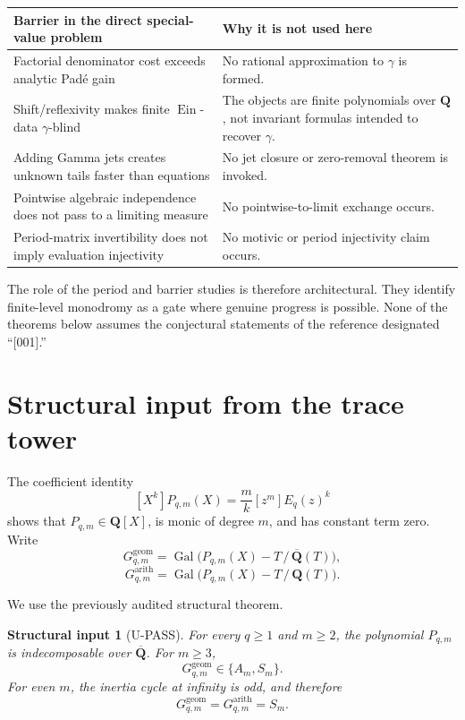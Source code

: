\documentclass[11pt]{article}
\theoremstyle{keio}
\theoremstyle{keioinput}
\newtheorem*{structural}{Structural input}
\newcommand{\UPASS}{\textcolor{passgreen}{\textsf{U-PASS}}}
\newcommand{\Q}{\mathbf{Q}}
\newcommand{\Gal}{\operatorname{Gal}}
\newcommand{\Ein}{\operatorname{Ein}}
\begin{document}
\begin{center}
\small
\begin{tabularx}{\textwidth}{@{}>{\raggedright\arraybackslash}p{}>{\raggedright\arraybackslash}X@{}}
\toprule
\textbf{Barrier in the direct special-value problem} &
\textbf{Why it is not used here}\\
\midrule
Factorial denominator cost exceeds analytic Pad\'e gain &
No rational approximation to $\gamma$ is formed.\\
Shift/reflexivity makes finite $\Ein$-data $\gamma$-blind &
The objects are finite polynomials over $\Q$, not invariant formulas intended to recover $\gamma$.\\
Adding Gamma jets creates unknown tails faster than equations &
No jet closure or zero-removal theorem is invoked.\\
Pointwise algebraic independence does not pass to a limiting measure &
No pointwise-to-limit exchange occurs.\\
Period-matrix invertibility does not imply evaluation injectivity &
No motivic or period injectivity claim occurs.\\
\bottomrule
\end{tabularx}
\end{center}

The role of the period and barrier studies is therefore architectural. They
identify finite-level monodromy as a gate where genuine progress is
possible. None of the theorems below assumes the conjectural statements of
the reference designated ``[001].''

\section{Structural input from the trace tower}

The coefficient identity
\[
[X^k]P_{q,m}(X)=\frac{m}{k}[z^m]E_q(z)^k
\]
shows that $P_{q,m}\in\Q[X]$, is monic of degree $m$, and has constant term
zero. Write
\[
G^{\mathrm{geom}}_{q,m}
=\Gal\bigl(P_{q,m}(X)-T\,/\,\overline{\Q}(T)\bigr),
\]
\[
G^{\mathrm{arith}}_{q,m}
=\Gal\bigl(P_{q,m}(X)-T\,/\,\Q(T)\bigr).
\]

We use the previously audited structural theorem.

\begin{structural}[\UPASS]
For every $q\ge1$ and $m\ge2$, the polynomial $P_{q,m}$ is
indecomposable over $\overline{\Q}$. For $m\ge3$,
\[
G^{\mathrm{geom}}_{q,m}\in\{A_m,S_m\}.
\]
For even $m$, the inertia cycle at infinity is odd, and therefore
\[
G^{\mathrm{geom}}_{q,m}=G^{\mathrm{arith}}_{q,m}=S_m.
\]
\end{structural}
\end{document}
